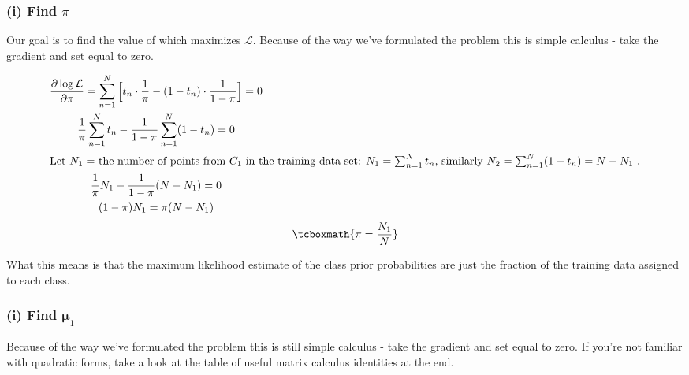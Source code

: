 \documentclass[11pt]{article}
\newcommand{\ub}{\symbf{\mu}}
\begin{document}
\begin{framed}
\subsubsection*{(i) Find $\pi$}
Our goal is to find the value of \pi which maximizes $\mathcal{L}$. Because of the way we've formulated the problem this is
simple calculus - take the gradient and set equal to zero.

\begin{gather*}
	\frac{\partial \log \mathcal{L}}{\partial \pi} = \sum_{n=1}^N \Big[ t_n \cdot \frac{1}{\pi} - (1 - t_n) \cdot \frac{1}{1 - \pi} \Big] = 0 \\
	\frac{1}{\pi} \sum_{n=1}^{N} t_n - \frac{1}{1-\pi} \sum_{n=1}^N (1 - t_n) = 0 \\
	\intertext{Let $N_1 = $ the number of points from $C_1$ in the training data set: $N_1 = \sum_{n=1}^N t_n$, similarly $N_2 = \sum_{n=1}^N (1 -  t_n) = N - N_1$ .}
	\frac{1}{\pi} N_1 - \frac{1}{1-\pi} (N - N_1) = 0 \\
	(1 - \pi) N_1 = \pi (N - N_1)  \\
\end{gather*}
\begin{equation}
	\tcboxmath{\pi = \frac{N_1}{N}}
\end{equation}

What this means is that the maximum likelihood estimate of the class prior probabilities are just the fraction of the training data assigned to each class. 


\subsubsection*{(i) Find $\ub_1$}
 Because of the way we've formulated the problem this is still simple calculus - take the gradient and set equal to zero. 
 If you're not familiar with quadratic forms, take a look at the table of useful matrix calculus identities at the end.


\end{framed}
\end{document}
